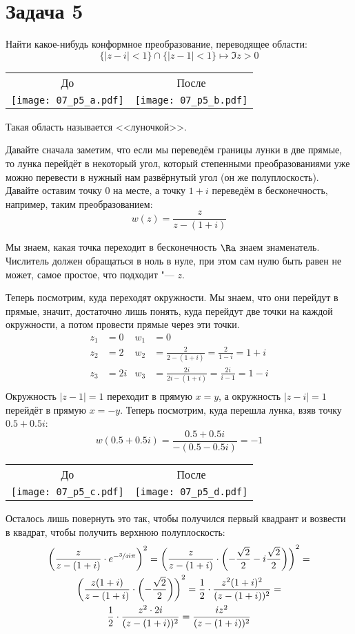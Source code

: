 \section{Задача 5}\label{day150331_task5}
	Найти какое-нибудь конформное преобразование, переводящее области:
	\[ \{ |z-i|<1 \} \cap \{ |z-1| < 1 \} \mapsto \Im z > 0 \]
	\begin{center}
		\begin{tabular}{cc}
		До & После \\
		\texttt{[image: 07\_p5\_a.pdf]} & \texttt{[image: 07\_p5\_b.pdf]} \\
		\end{tabular}
	\end{center}
	Такая область называется <<луночкой>>.

	Давайте сначала заметим, что если мы переведём границы лунки в две прямые, то лунка перейдёт в некоторый угол,
	который степенными преобразованиями уже можно перевести в нужный нам развёрнутый угол (он же полуплоскость).
	Давайте оставим точку 0 на месте, а точку $1+i$ переведём в бесконечность, например, таким преобразованием:
	\[ w(z) = \frac{z}{z-(1+i)} \]
	\begin{Rem}
		Мы знаем, какая точка переходит в бесконечность $\Ra$ знаем знаменатель.
		Числитель должен обращаться в ноль в нуле, при этом сам нулю быть равен не может,
		самое простое, что подходит "--- $z$.
	\end{Rem}
	Теперь посмотрим, куда переходят окружности.
	Мы знаем, что они перейдут в прямые, значит, достаточно лишь понять, куда перейдут две точки на каждой окружности,
	а потом провести прямые через эти точки.
	\begin{align*}
		z_1 &= 0 & w_1 &= 0 \\
		z_2 &= 2 & w_2 &= \frac{2}{2-(1+i)} = \frac{2}{1-i} = 1 + i \\
		z_3 &= 2i & w_3 &= \frac{2i}{2i-(1+i)} = \frac{2i}{i-1} = 1-i \\
	\end{align*}
	Окружность $|z-1|=1$ переходит в прямую $x=y$, а окружность $|z-i|=1$ перейдёт в прямую $x=-y$.
	Теперь посмотрим, куда перешла лунка, взяв точку $0.5+0.5i$:
	\[ w(0.5+0.5i) = \frac{0.5+0.5i}{-(0.5-0.5i)} = -1 \]
	\begin{center}
		\begin{tabular}{cc}
		До & После \\
		\texttt{[image: 07\_p5\_c.pdf]} & \texttt{[image: 07\_p5\_d.pdf]} \\
		\end{tabular}
	\end{center}
	Осталось лишь повернуть это так, чтобы получился первый квадрант и возвести в квадрат, чтобы получить верхнюю полуплоскость:
	\begin{gather*}
		\left(\frac{z}{z-(1+i)} \cdot e^{-\sfrac 3 4 i \pi}\right)^2 =
		\left(\frac{z}{z-(1+i)} \cdot \left(-\frac{\sqrt 2}{2} -i\frac{\sqrt 2}{2}\right)\right)^2 = \\
		\left(\frac{z(1+i)}{z-(1+i)} \cdot \left(-\frac{\sqrt 2}{2}\right)\right)^2 =
		\frac12 \cdot \frac{z^2(1+i)^2}{(z-(1+i))^2} = \\
		\frac12 \cdot \frac{z^2\cdot2i}{(z-(1+i))^2} =
		\frac{iz^2}{(z-(1+i))^2}
	\end{gather*}
